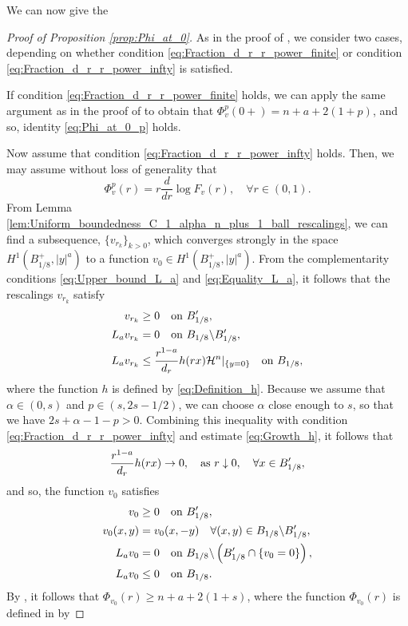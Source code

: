\documentclass[11pt,reqno]{amsart}
\theoremstyle{definition}
\theoremstyle{remark}
\begin{document}
We can now give the 
\begin{proof}[Proof of Proposition \ref{prop:Phi_at_0}]
As in the proof of \cite[Lemma 6.1]{Caffarelli_Salsa_Silvestre_2008}, we consider two cases, depending on whether condition \eqref{eq:Fraction_d_r_r_power_finite} or condition \eqref{eq:Fraction_d_r_r_power_infty} is satisfied. 

If condition \eqref{eq:Fraction_d_r_r_power_finite} holds, we can apply the same argument as in the proof of \cite[Lemma 6.1]{Caffarelli_Salsa_Silvestre_2008} to obtain that $\Phi^p_v(0+)=n+a+2(1+p)$, and so, identity \eqref{eq:Phi_at_0_p} holds.

Now assume that condition \eqref{eq:Fraction_d_r_r_power_infty} holds. Then, we may assume without loss of generality that
$$
\Phi^p_v(r) = r \frac{d}{dr} \log F_v(r),\quad\forall r \in (0,1).
$$
From Lemma \ref{lem:Uniform_boundedness_C_1_alpha_n_plus_1_ball_rescalings}, we can find a subsequence, $\{v_{r_k}\}_{k>0}$, which converges strongly in the space $H^1(B^+_{1/8},|y|^a)$ to a function $v_0\in H^1(B^+_{1/8},|y|^a)$. From the complementarity conditions \eqref{eq:Upper_bound_L_a} and \eqref{eq:Equality_L_a}, it follows that the rescalings $v_{r_k}$ satisfy 
\begin{align*}
v_{r_k} &\geq 0 \quad\hbox{on } B'_{1/8},\\
L_a v_{r_k} &=0 \quad\hbox{on } B_{1/8}\backslash B'_{1/8},\\
L_a v_{r_k} &\leq \frac{r^{1-a}}{d_r} h(rx){{\mathcal{H}}}^{n}|_{\{y=0\}} \quad\hbox{on } B_{1/8}, 
\end{align*}
where the function $h$ is defined by \eqref{eq:Definition_h}. Because we assume that $\alpha\in (0,s)$ and $p\in (s,2s-1/2)$, we can choose $\alpha$ close enough to $s$, so that we have $2s+\alpha-1-p>0$. Combining this inequality with condition \eqref{eq:Fraction_d_r_r_power_infty} and estimate \eqref{eq:Growth_h}, it follows that
$$
\frac{r^{1-a}}{d_r} h(rx) \rightarrow 0,\quad\hbox{as } r\downarrow 0,\quad\forall x \in B'_{1/8},
$$
and so, the function $v_0$ satisfies
\begin{align*}
v_0 &\geq 0 \quad\hbox{on } B'_{1/8},\\
v_0(x,y)&=v_0(x,-y) \quad\forall  (x,y)\in B_{1/8}\backslash B'_{1/8},\\
L_a v_0 &=0 \quad\hbox{on } B_{1/8}\backslash \left( B'_{1/8}\cap\{v_0=0\}\right),\\
L_a v_0 &\leq 0 \quad\hbox{on } B_{1/8}.
\end{align*}
By \cite[Lemma 6.1]{Caffarelli_Salsa_Silvestre_2008}, it follows that $\Phi_{v_0}(r) \geq n+a+2(1+s)$, where the function $\Phi_{v_0}(r)$ is defined in \cite[Formula (3.22)]{Caffarelli_Salsa_Silvestre_2008} by

\end{proof}
\end{document}
